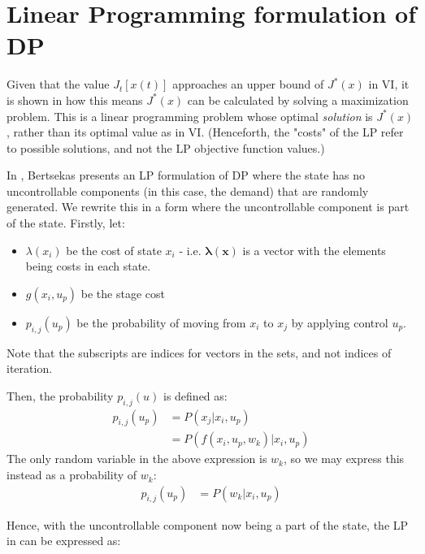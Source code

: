 \documentclass[conference]{IEEEtran}
\begin{document}


\section{Linear Programming formulation of DP}
Given that the value $J_{t}[x(t)]$ approaches an upper bound of $J^{*}(x)$ in VI, it is shown in \cite{Bertsekas:2007:DPO:1396348} how this means $J^{*}(x)$ can be calculated by solving a maximization problem. This is a linear programming problem whose optimal \textit{solution} is $J^{*}(x)$, rather than its optimal value as in VI. (Henceforth, the "costs" of the LP refer to possible solutions, and not the LP objective function values.)


In \cite{Bertsekas:2007:DPO:1396348}, Bertsekas presents an LP formulation of DP where the state has no uncontrollable components (in this case, the demand) that are randomly generated. We rewrite this in a form where the uncontrollable component is part of the state. Firstly, let:
\begin{itemize}
	\item $\lambda(x_{i})$ be the cost of state $x_{i}$ - i.e. $\boldsymbol{\lambda(x)}$ is a vector with the elements being costs in each state.
	\item $g(x_{i},u_{p})$ be the stage cost
	\item $p_{i,j}(u_{p})$ be the probability of moving from $x_{i}$ to $x_{j}$ by applying control $u_{p}$.
\end{itemize} Note that the subscripts are indices for vectors in the sets, and not indices of iteration.

Then, the probability $p_{i,j}(u)$ is defined as: \begin{align*} 
p_{i,j}(u_{p})&= P(x_{j}| x_{i},u_{p})\\ 
&= P(f(x_{i},u_{p},w_{k})| x_{i},u_{p})
\end{align*} The only random variable in the above expression is $w_{k}$, so we may express this instead as a probability of $w_{k}$:
\begin{align*} 
    p_{i,j}(u_{p})&= P(w_{k} | x_{i},u_{p})
\end{align*}

Hence, with the uncontrollable component now being a part of the state, the LP in \cite{Bertsekas:2007:DPO:1396348} can be expressed as:
\end{document}
